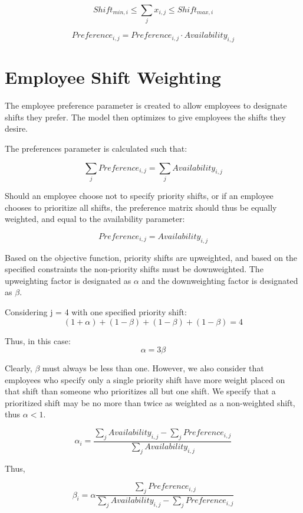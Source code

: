 $$ \begin{equation}\label{employeeshifts} Shift_{min,i}\le \sum\limits_{j}x_{i,j} \le Shift_{max,i} \end{equation}$$


$$ \begin{equation}\label{preference} Preference_{i,j} =   Preference_{i,j} \cdot Availability_{i,j} \end{equation}$$


\section{Employee Shift Weighting}
The employee preference parameter is created to allow employees to designate shifts they prefer. The model then optimizes to give employees the shifts they desire. 

The preferences parameter is calculated such that:

$$\sum\limits_{j}Preference_{i,j} = \sum\limits_{j}Availability_{i,j}$$

Should an employee choose not to specify priority shifts, or if an employee chooses to prioritize all shifts, the preference matrix should thus be equally weighted, and equal to the availability parameter:

$$Preference_{i,j} = Availability_{i,j}$$

Based on the objective function, priority shifts are upweighted, and based on the specified constraints the non-priority shifts must be downweighted. The upweighting factor is designated as $\alpha$ and the downweighting factor is designated as $\beta$. 

Considering j = 4 with one specified priority shift:
$$ (1 + \alpha) + (1-\beta) + (1-\beta) + (1-\beta) = 4 $$

Thus, in this case: $$\alpha = 3\beta$$

Clearly, $\beta$ must always be less than one. However, we also consider that employees who specify only a single priority shift have more weight placed on that shift than someone who prioritizes all but one shift.  We specify that a prioritized shift may be no more than twice as weighted as a non-weighted shift, thus $\alpha<1$.

$$\alpha_{i} = \frac{\sum\limits_{j}Availability_{i,j} - \sum\limits_{j}Preference_{i,j}}{\sum\limits_{j}Availability_{i,j}}$$

Thus,

$$\beta_{i} = \alpha \frac{\sum\limits_{j}Preference_{i,j}}{\sum\limits_{j}Availability_{i,j} - \sum\limits_{j}Preference_{i,j}}$$

